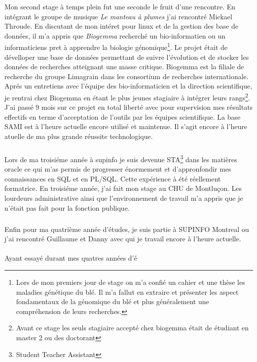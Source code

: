 \documentclass[11pt, a4paper ]{article}
\begin{document}
\begin{spacing}{1.5}
Mon second stage à temps plein fut une seconde le fruit d'une rencontre. En intégrant le groupe de musique \emph{Le manteau à plumes} j'ai rencontré Mickael Throude. En discutant de mon intéret pour linux et de la gestion des base de données, il m'a appris que \emph{Biogemma} recherché un bio-informatien ou un informaticiens pret à apprendre la biologie génomique\footnote{Lors de mon premiers jour de stage on m'a confié un cahier et une thèse les maladies génétique du blé. Il m'a fallut en extraire et présenter les aspect fondamentaux de la génomique du blé et plus généralement une compréhension de leurs recherches.}. Le projet était de dévelloper une base de données permettant de suivre l'évolution et de stocker les données de recherches atteignant une masse critique. Biogemma est la filiale de recherche du groupe Limagrain dans les consortium de recherches internationale. Aprés un entretiens avec l'équipe des bio-informaticien et la direction scientifique, je rentrai chez Biogemma en étant le plus jeunes stagiaire à intégrer leurs rangs\footnote{Avant ce stage les seuls stagiaire accepté chez biogemma était de étudiant en master 2 ou des doctorant}. J'ai passé 9 mois sur ce projet en total liberté avec pour supervision mes résultats effectifs en terme d'acceptation de l'outils par les équipes scientifique. La base SAMI est à l'heure actuelle encore utilisé et maintenue. Il s'agit encore à l'heure atuelle de ma plus grande réussite technologique. 
\subparagraph{} 
Lors de ma troisiéme année à supinfo je suis devenue STA\footnote{Student Teacher Assistant} dans les matières oracle ce qui m'as permis de progresser énormement et d'appronfondir mes connaissances en SQL et en PL/SQL. Cette expérience à été réellement formatrice. 
En troisiéme année, j'ai fait mon stage au CHU de Montluçon. Les lourdeurs administrative ainsi que l'environnement de travail m'a appris que je n'était pas fait pour la fonction publique.
\subparagraph{}
Enfin pour ma quatrième année d'études, je suis partie à SUPINFO Montreal ou j'ai rencontré Guillaume et Danny avec qui je travail encore  à l'heure actuelle. 


\paragraph{}
Ayant essayé durant mes quatres années d'é









\end{spacing}
\end{document}
